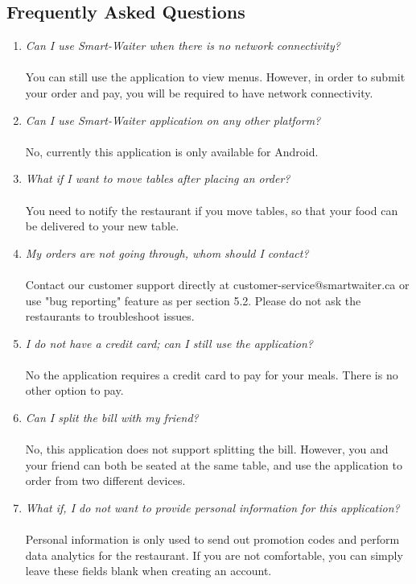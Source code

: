 \documentclass[12pt, titlepage]{article}
\begin{document}
\subsection{Frequently Asked Questions}
\begin{enumerate}
	\item \emph{Can I use Smart-Waiter when there is no network connectivity?}\\\\
	You can still use the application to view menus. However, in order to submit your order and pay, you will be required to have network connectivity.
	\item \emph{Can I use Smart-Waiter application on any other platform?}\\\\
	No, currently this application is only available for Android.
	\item \emph{What if I want to move tables after placing an order?}\\\\
	You need to notify the restaurant if you move tables, so that your food can be delivered to your new table.
	\item \emph{My orders are not going through, whom should I contact?}\\\\
	Contact our customer support directly at customer-service@smartwaiter.ca or use "bug reporting" feature as per section 5.2. Please do not ask the restaurants to troubleshoot issues.
	\item \emph{I do not have a credit card; can I still use the application?}\\\\
	No the application requires a credit card to pay for your meals. There is no other option to pay.
	\item \emph{Can I split the bill with my friend?}\\\\
	No, this application does not support splitting the bill. However, you and your friend can both be seated at the same table, and use the application to order from two different devices. 
	\item \emph{What if, I do not want to provide personal information for this application?}\\\\
	Personal information is only used to send out promotion codes and perform data analytics for the restaurant. If you are not comfortable, you can simply leave these fields blank when 	   creating an account.

\end{enumerate}
\end{document}
